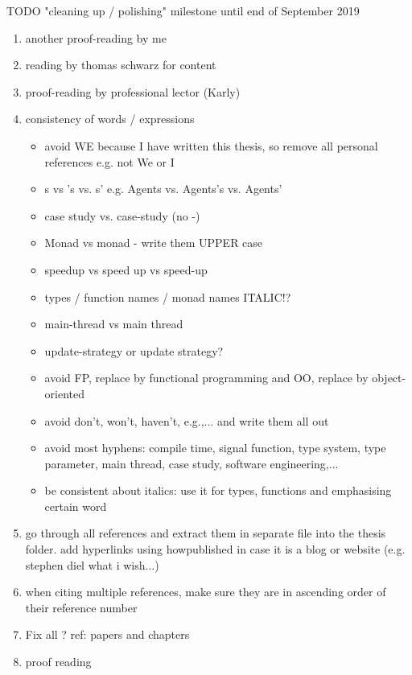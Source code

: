 \documentclass[oneside]{book}
\begin{document}
TODO "cleaning up / polishing" milestone until end of September 2019
\begin{enumerate}
	\item another proof-reading by me	
	
	\item reading by thomas schwarz for content
		
	\item proof-reading by professional lector (Karly)

	\item consistency of words / expressions
		\begin{itemize}
			\item avoid WE because I have written this thesis, so remove all personal references e.g. not We or I
			\item s vs 's vs. s' e.g. Agents vs. Agents's vs. Agents'
			\item case study vs. case-study (no -)
			\item Monad vs monad - write them UPPER case
			\item speedup vs speed up vs speed-up
			\item types / function names / monad names ITALIC!?
			\item main-thread vs main thread
			\item update-strategy or update strategy?
			\item avoid FP, replace by functional programming and OO, replace by object-oriented
			\item avoid don't, won't, haven't, e.g.,... and write them all out
			\item avoid most hyphens: compile time, signal function, type system, type parameter, main thread, case study, software engineering,...
			\item be consistent about italics: use it for types, functions and emphasising certain word
		\end{itemize}
		
	\item go through all references and extract them in separate file into the thesis folder. add hyperlinks using howpublished in case it is a blog or website (e.g. stephen diel what i wish...)
	
	\item when citing multiple references, make sure they are in ascending order of their reference number
	\item Fix all ? ref: papers and chapters
		
	\item proof reading
	

\end{enumerate}
\end{document}
